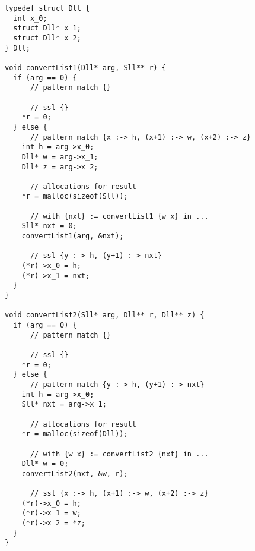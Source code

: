 \begin{lstlisting}
typedef struct Dll {
  int x_0;
  struct Dll* x_1;
  struct Dll* x_2;
} Dll;

void convertList1(Dll* arg, Sll** r) {
  if (arg == 0) {
      // pattern match {}

      // ssl {}
    *r = 0;
  } else {
      // pattern match {x :-> h, (x+1) :-> w, (x+2) :-> z}
    int h = arg->x_0;
    Dll* w = arg->x_1;
    Dll* z = arg->x_2;

      // allocations for result
    *r = malloc(sizeof(Sll));

      // with {nxt} := convertList1 {w x} in ...
    Sll* nxt = 0;
    convertList1(arg, &nxt);

      // ssl {y :-> h, (y+1) :-> nxt}
    (*r)->x_0 = h;
    (*r)->x_1 = nxt;
  }
}

void convertList2(Sll* arg, Dll** r, Dll** z) {
  if (arg == 0) {
      // pattern match {}

      // ssl {}
    *r = 0;
  } else {
      // pattern match {y :-> h, (y+1) :-> nxt}
    int h = arg->x_0;
    Sll* nxt = arg->x_1;

      // allocations for result
    *r = malloc(sizeof(Dll));

      // with {w x} := convertList2 {nxt} in ...
    Dll* w = 0;
    convertList2(nxt, &w, r);

      // ssl {x :-> h, (x+1) :-> w, (x+2) :-> z}
    (*r)->x_0 = h;
    (*r)->x_1 = w;
    (*r)->x_2 = *z;
  }
}
\end{lstlisting}

